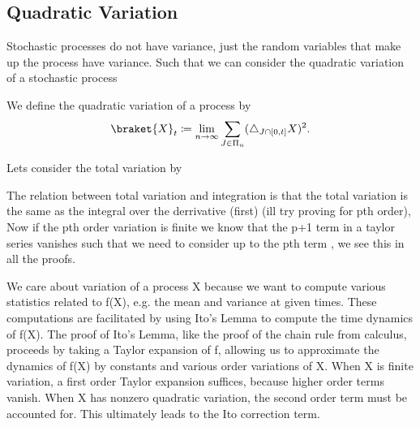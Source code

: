 \subsection{Quadratic Variation}
Stochastic processes do not have variance, just the random variables that make up the process have variance. 
Such that we can consider the quadratic variation of a stochastic process 
\begin{definition}
 We define the quadratic variation of a process by 
 \begin{align*}
   \braket{X}_t \coloneqq  \lim_{n \to  \infty} \sum_{J \in  \Pi_n}(\triangle_{J \cap [0,t]} X)^2
 .\end{align*}
\end{definition}
Lets consider the total variation by 
\begin{remark}
 The relation between total variation and integration is that the total variation is the same as the integral over the derrivative (first)  (ill try proving for pth order),
 Now if the pth order variation is finite we know that the p+1 term in a taylor series vanishes such that we need to consider up to the pth term , we see this in all the proofs.
\end{remark}
We care about variation of a process X because we want to compute various statistics related to f(X), e.g. the mean and variance at given times. These computations are facilitated by using Ito’s Lemma to compute the time dynamics of f(X). The proof of Ito’s Lemma, like the proof of the chain rule from calculus, proceeds by taking a Taylor expansion of f, allowing us to approximate the dynamics of f(X) by constants and various order variations of X. When X is finite variation, a first order Taylor expansion suffices, because higher order terms vanish. When X has nonzero quadratic variation, the second order term must be accounted for. This ultimately leads to the Ito correction term.
